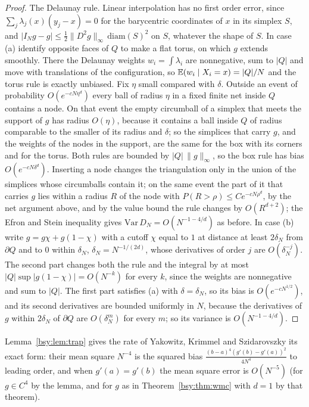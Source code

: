 \begin{proof}
The Delaunay rule. Linear interpolation has no first order error, since $\sum_j\lambda_j(x)(y_j-x)=0$ for the barycentric coordinates of $x$ in its simplex $S$, and $|I_Ng-g|\le\frac12\|D^2g\|_\infty\,\mathrm{diam}(S)^2$ on $S$, whatever the shape of $S$. In case (a) identify opposite faces of $Q$ to make a flat torus, on which $g$ extends smoothly. There the Delaunay weights $w_i=\int\lambda_i$ are nonnegative, sum to $|Q|$ and move with translations of the configuration, so $\mathbb{E}(w_i\mid X_i=x)=|Q|/N$ and the torus rule is exactly unbiased. Fix $\eta$ small compared with $\delta$. Outside an event of probability $O(e^{-cN\eta^d})$ every ball of radius $\eta$ in a fixed finite net inside $Q$ contains a node. On that event the empty circumball of a simplex that meets the support of $g$ has radius $O(\eta)$, because it contains a ball inside $Q$ of radius comparable to the smaller of its radius and $\delta$; so the simplices that carry $g$, and the weights of the nodes in the support, are the same for the box with its corners and for the torus. Both rules are bounded by $|Q|\,\|g\|_\infty$, so the box rule has bias $O(e^{-cN\delta^d})$. Inserting a node changes the triangulation only in the union of the simplices whose circumballs contain it; on the same event the part of it that carries $g$ lies within a radius $R$ of the node with $P(R>\rho)\le Ce^{-cN\rho^d}$, by the net argument above, and by the value bound the rule changes by $O(R^{d+2})$; the Efron and Stein inequality gives $\mathrm{Var}\,D_N=O(N^{-1-4/d})$ as before. In case (b) write $g=g\chi+g(1-\chi)$ with a cutoff $\chi$ equal to $1$ at distance at least $2\delta_N$ from $\partial Q$ and to $0$ within $\delta_N$, $\delta_N=N^{-1/(2d)}$, whose derivatives of order $j$ are $O(\delta_N^{-j})$. The second part changes both the rule and the integral by at most $|Q|\sup|g(1-\chi)|=O(N^{-k})$ for every $k$, since the weights are nonnegative and sum to $|Q|$. The first part satisfies (a) with $\delta=\delta_N$, so its bias is $O(e^{-cN^{1/2}})$, and its second derivatives are bounded uniformly in $N$, because the derivatives of $g$ within $2\delta_N$ of $\partial Q$ are $O(\delta_N^m)$ for every $m$; so its variance is $O(N^{-1-4/d})$.
\end{proof}

Lemma~\ref{bsy:lem:trap} gives the rate of Yakowitz, Krimmel and Szidarovszky its exact form: their mean square $N^{-4}$ is the squared bias $\frac{(b-a)^4(g'(b)-g'(a))^2}{4N^4}$ to leading order, and when $g'(a)=g'(b)$ the mean square error is $O(N^{-5})$ (for $g\in C^4$ by the lemma, and for $g$ as in Theorem~\ref{bsy:thm:wmc} with $d=1$ by that theorem).

